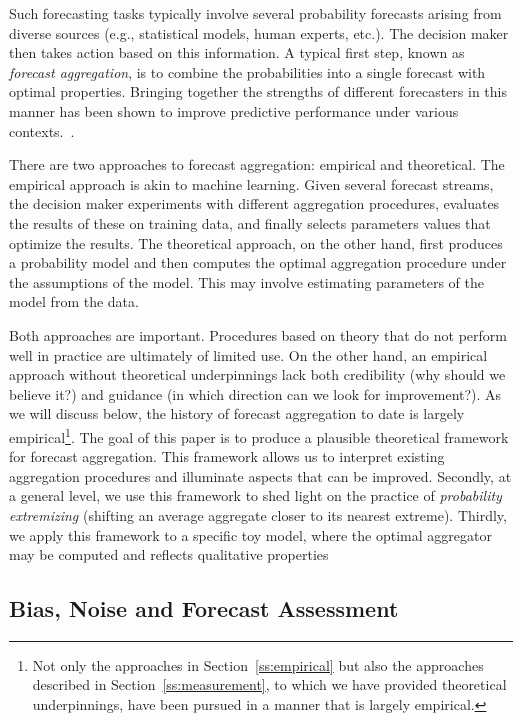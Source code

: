 \documentclass[11pt]{article}
\theoremstyle{definition}
\theoremstyle{definition}
\begin{document}
Such forecasting tasks typically involve several probability forecasts arising from diverse sources (e.g., statistical models, human experts, etc.). The decision maker then takes action based on this information. A typical first step, known as \textit{forecast aggregation}, is to combine the probabilities  into a single forecast with optimal properties. Bringing together the
strengths of different forecasters in this manner has been shown to improve predictive
performance under various contexts.~\citep{clemen1989combining, armstrong2001combining}.

There are two approaches to forecast aggregation: empirical
and theoretical.  The empirical approach is akin to machine
learning.  Given several forecast streams, the decision maker experiments
with different aggregation procedures, evaluates the results
of these on training data, and finally selects parameters values that optimize 
the results.  The theoretical approach, on the other hand, first produces a probability
model and then computes the optimal aggregation procedure under the 
assumptions of the model.  This may involve estimating parameters 
of the model from the data.  

Both approaches are important.  Procedures based on theory that
do not perform well in practice are ultimately of limited use.
On the other hand, an empirical approach without theoretical
underpinnings lack both credibility (why should we believe it?)
and guidance (in which direction can we look for improvement?).
As we will discuss below, the history of forecast aggregation
to date is largely empirical\footnote{Not only the approaches in
Section~\ref{ss:empirical} but also the approaches described in
Section~\ref{ss:measurement}, to which we have provided theoretical 
underpinnings, have been pursued in a manner that is largely empirical.}.  
The goal of this paper is to
produce a plausible theoretical framework for forecast aggregation.
This framework allows us to interpret existing aggregation 
procedures and illuminate aspects that can be improved.
Secondly, at a general level, we use this framework to shed light on 
the practice of {\em probability extremizing} (shifting an average aggregate closer to its nearest extreme). Thirdly, we apply
this framework to a specific toy model, where the optimal 
aggregator may be computed and reflects qualitative properties 

\subsection{Bias, Noise and Forecast Assessment}
\end{document}
